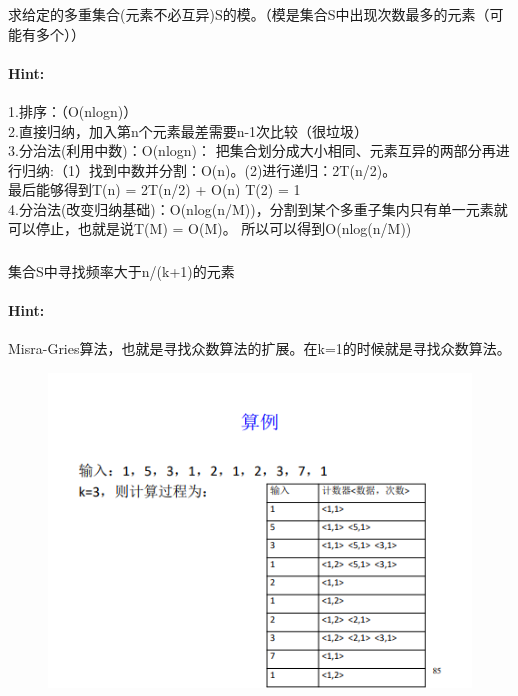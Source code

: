 \documentclass{article}
\begin{document}
      \subsubsection{}求给定的多重集合(元素不必互异)S的模。（模是集合S中出现次数最多的元素（可能有多个））
     \paragraph{Hint:}1.排序：（O(nlogn)）\\
2.直接归纳，加入第n个元素最差需要n-1次比较（很垃圾）\\
3.分治法(利用中数)：O(nlogn)： 把集合划分成大小相同、元素互异的两部分再进行归纳:（1）找到中数并分割：O(n)。(2)进行递归：2T(n/2)。\\
最后能够得到T(n) = 2T(n/2) + O(n) T(2) = 1\\
4.分治法(改变归纳基础)：O(nlog(n/M))，分割到某个多重子集内只有单一元素就可以停止，也就是说T(M) = O(M)。 所以可以得到O(nlog(n/M))\\
     
     
     \subsubsection{}集合S中寻找频率大于n/(k+1)的元素
     \paragraph{Hint:}Misra-Gries算法，也就是寻找众数算法的扩展。在k=1的时候就是寻找众数算法。
     
    \begin{figure}[h]
 	\centering
 	\includegraphics[scale=0.6]{Misra-Gries.png}
    \end{figure}
     
\end{document}
